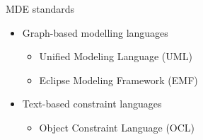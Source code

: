 \documentclass[dvips,slidetop,mathserif,red]{beamer}
\begin{document}
\begin{frame}{MDE standards}
  \begin{itemize}
    \item Graph-based modelling languages
    \begin{itemize}
      \item Unified Modeling Language (UML)
      \item Eclipse Modeling Framework (EMF)
    \end{itemize}
    \item Text-based constraint languages
    \begin{itemize}
      \item Object Constraint Language (OCL)
    \end{itemize}
  \end{itemize}
\end{frame}

\end{document}
